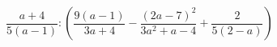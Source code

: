 \begin{ex}[type=expression]
	\begin{condition}
		\( \dfrac{a+4}{5(a-1)}:\left( \dfrac{9(a-1)}{3a+4}-\dfrac{(2a-7)^2}{3a^2+a-4}+\dfrac{2}{5(2-a)} \right) \)
	\end{condition}
\end{ex}